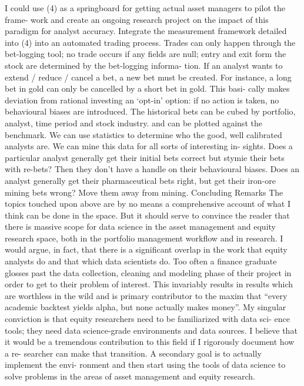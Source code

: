 \documentclass[11pt,preprint, authoryear]{elsarticle}
\numberwithin{equation}{section}
\numberwithin{figure}{section}
\numberwithin{table}{section}
\begin{document}
I could use (4) as a springboard for getting actual asset managers to
pilot the frame- work and create an ongoing research project on the
impact of this paradigm for analyst accuracy. Integrate the measurement
framework detailed into (4) into an automated trading process. Trades
can only happen through the bet-logging tool; no trade occurs if any
fields are null; entry and exit form the stock are determined by the
bet-logging informa- tion. If an analyst wants to extend / reduce /
cancel a bet, a new bet must be created. For instance, a long bet in
gold can only be cancelled by a short bet in gold. This basi- cally
makes deviation from rational investing an `opt-in' option: if no action
is taken, no behavioural biases are introduced. The historical bets can
be cubed by portfolio, analyst, time period and stock industry. and can
be plotted against the benchmark. We can use statistics to determine who
the good, well calibrated analysts are. We can mine this data for all
sorts of interesting in- sights. Does a particular analyst generally get
their initial bets correct but stymie their bets with re-bets? Then they
don't have a handle on their behavioural biases. Does an analyst
generally get their pharmaceutical bets right, but get their iron-ore
mining bets wrong? Move them away from mining. Concluding Remarks The
topics touched upon above are by no means a comprehensive account of
what I think can be done in the space. But it should serve to convince
the reader that there is massive scope for data science in the asset
management and equity research space, both in the portfolio management
workflow and in research. I would argue, in fact, that there is a
significant overlap in the work that equity analysts do and that which
data scientists do. Too often a finance graduate glosses past the data
collection, cleaning and modeling phase of their project in order to get
to their problem of interest. This invariably results in results which
are worthless in the wild and is primary contributor to the maxim that
``every academic backtest yields alpha, but none actually makes money''.
My singular conviction is that equity researchers need to be
familiarized with data sci- ence tools; they need data science-grade
environments and data sources. I believe that it would be a tremendous
contribution to this field if I rigorously document how a re- searcher
can make that transition. A secondary goal is to actually implement the
envi- ronment and then start using the tools of data science to solve
problems in the areas of asset management and equity research.

\newpage
\nocite{*}

\end{document}
